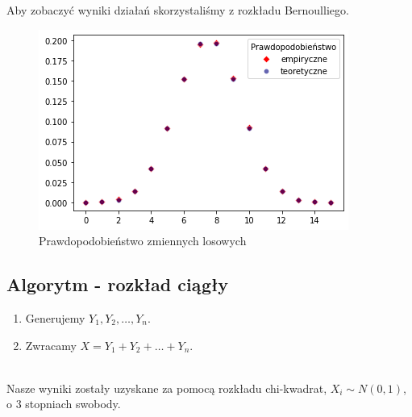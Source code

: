 \documentclass[12pt]{mwart}
\begin{document}
 	\noindent Aby zobaczyć wyniki działań skorzystaliśmy z rozkładu Bernoulliego. 
 	
 	\begin{figure}[H]
 	\begin{center}
 		\includegraphics[scale=0.6]{splot1.png}
 		\caption{Prawdopodobieństwo zmiennych losowych}
 	\end{center}
 	\end{figure}
 
 	\subsection{Algorytm - rozkład ciągły}
 	\begin{enumerate}
 		\item Generujemy $ Y_1, Y_2, \dots, Y_n $.
 		\item Zwracamy $ X = Y_1 + Y_2 + \dots + Y_n $. \\ \\
 	\end{enumerate}
 	
 	\noindent Nasze wyniki zostały uzyskane za pomocą rozkładu chi-kwadrat, $X_i  \sim N(0,1)$, o $3$ stopniach swobody.
 	
\end{document}
